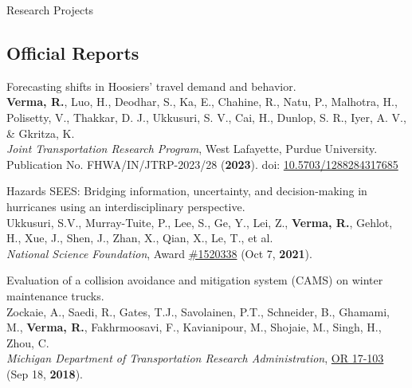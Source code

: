 \documentclass{CV} %
\begin{document}
\begin{rSection}{Research Projects}
    \subsection*{Official Reports}
    \begin{etaremune}
        \item Forecasting shifts in Hoosiers' travel demand and behavior.
        \\ \textbf{Verma, R.}, Luo, H., Deodhar, S., Ka, E., Chahine, R., Natu, P., Malhotra, H., Polisetty, V., Thakkar, D. J., Ukkusuri, S. V., Cai, H., Dunlop, S. R., Iyer, A. V., \& Gkritza, K.
        \\ \textit{Joint Transportation Research Program}, West Lafayette, Purdue University.
        \\ Publication No. FHWA/IN/JTRP-2023/28 (\textbf{2023}). doi: \href{https://doi.org/10.5703/1288284317685}{10.5703/1288284317685}
        \item Hazards SEES: Bridging information, uncertainty, and decision-making in hurricanes using an interdisciplinary perspective.
        \\ Ukkusuri, S.V., Murray-Tuite, P., Lee, S., Ge, Y., Lei, Z., \textbf{Verma, R.}, Gehlot, H., Xue, J., Shen, J., Zhan, X., Qian, X., Le, T., et al.
        \\ \textit{National Science Foundation}, Award \href{https://www.nsf.gov/awardsearch/showAward?AWD_ID=1520338}{\#1520338} (Oct 7, \textbf{2021}).
        
        \item Evaluation of a collision avoidance and mitigation system (CAMS) on winter maintenance trucks.
        \\ Zockaie, A., Saedi, R., Gates, T.J., Savolainen, P.T., Schneider, B., Ghamami, M., \textbf{Verma, R.}, Fakhrmoosavi, F., Kavianipour, M., Shojaie, M., Singh, H., Zhou, C.
        \\ \textit{Michigan Department of Transportation Research Administration}, \href{https://rosap.ntl.bts.gov/view/dot/42752}{OR 17-103} (Sep 18, \textbf{2018}).
    \end{etaremune}


\end{rSection}
\end{document}
